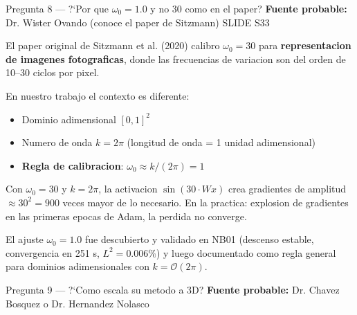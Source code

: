 \vspace{8pt}

\begin{qabox}{Pregunta 8 --- ?`Por que $\omega_0 = 1.0$ y no 30 como en el paper?}
\textbf{Fuente probable:} Dr. Wister Ovando (conoce el paper de Sitzmann)
\quad \colorbox{ujatred!20}{\small SLIDE S33}
\end{qabox}

\begin{answerbox}
El paper original de Sitzmann et al. (2020) calibro $\omega_0 = 30$ para
\textbf{representacion de imagenes fotograficas}, donde las frecuencias de variacion
son del orden de 10--30 ciclos por pixel.

En nuestro trabajo el contexto es diferente:
\begin{itemize}
  \item Dominio adimensional $[0,1]^2$
  \item Numero de onda $k = 2\pi$ (longitud de onda = 1 unidad adimensional)
  \item \textbf{Regla de calibracion}: $\omega_0 \approx k / (2\pi) = 1$
\end{itemize}

Con $\omega_0 = 30$ y $k = 2\pi$, la activacion $\sin(30 \cdot Wx)$ crea gradientes
de amplitud $\approx 30^2 = 900$ veces mayor de lo necesario. En la practica:
explosion de gradientes en las primeras epocas de Adam, la perdida no converge.

El ajuste $\omega_0 = 1.0$ fue descubierto y validado en NB01 (descenso estable,
convergencia en 251 s, $L^2 = 0.006\%$) y luego documentado como regla general
para dominios adimensionales con $k = \mathcal{O}(2\pi)$.
\end{answerbox}

\vspace{8pt}

\begin{qabox}{Pregunta 9 --- ?`Como escala su metodo a 3D?}
\textbf{Fuente probable:} Dr. Chavez Bosquez o Dr. Hernandez Nolasco
\end{qabox}

